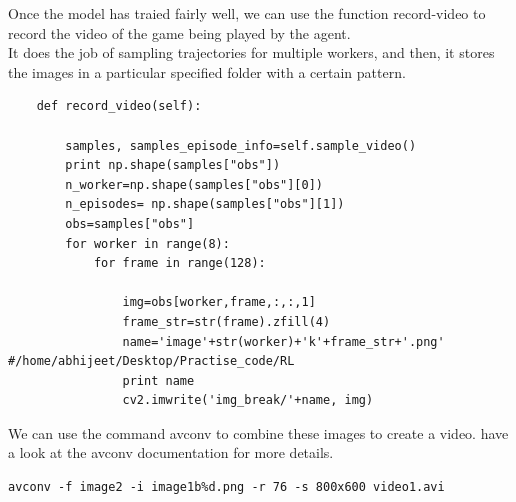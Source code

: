 \documentclass[12pt]{extarticle}
\begin{document}
Once the model has traied fairly well, we can use the function record-video to record the video of the game being played by the agent. \\
It does the job of sampling trajectories for multiple workers, and then, it stores the images in a particular specified folder with a certain pattern. \\

\begin{lstlisting}
	def record_video(self):

		samples, samples_episode_info=self.sample_video()
		print np.shape(samples["obs"])
		n_worker=np.shape(samples["obs"][0])
		n_episodes=	np.shape(samples["obs"][1])
		obs=samples["obs"]
		for worker in range(8):		
			for frame in range(128):

				img=obs[worker,frame,:,:,1]	
				frame_str=str(frame).zfill(4)
				name='image'+str(worker)+'k'+frame_str+'.png' #/home/abhijeet/Desktop/Practise_code/RL
				print name
				cv2.imwrite('img_break/'+name, img)
\end{lstlisting}

We can use the command avconv to combine these images to create a video. 
have a look at the avconv documentation for more details. 
\begin{lstlisting}
avconv -f image2 -i image1b%d.png -r 76 -s 800x600 video1.avi
\end{lstlisting}
\end{document}
